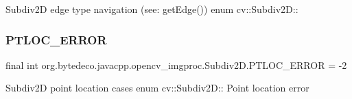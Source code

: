 Subdiv2D edge type navigation (see\+: get\+Edge()) enum cv\+::\+Subdiv2D\+:\+: \mbox{\label{group__imgproc_gaf2036f8d8ea03c954d0ab11577b69276}} 
\subsubsection{\texorpdfstring{P\+T\+L\+O\+C\+\_\+\+E\+R\+R\+OR}{PTLOC\_ERROR}}
{\footnotesize\ttfamily final int org.\+bytedeco.\+javacpp.\+opencv\+\_\+imgproc.\+Subdiv2\+D.\+P\+T\+L\+O\+C\+\_\+\+E\+R\+R\+OR = -\/2\hspace{0.3cm}{\ttfamily [static]}}

Subdiv2D point location cases enum cv\+::\+Subdiv2D\+:\+: Point location error 